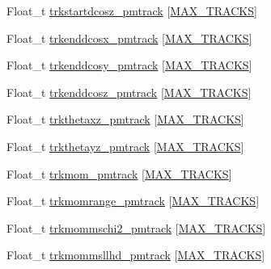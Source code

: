 \begin{DoxyCompactItemize}
\item 
Float\-\_\-t \hyperlink{classanatree_aeb6ed771022d17477ea745f1200225b0}{trkstartdcosz\-\_\-pmtrack} \mbox{[}\hyperlink{anatree__core__v09410002_8h_a327fd4e796e4a0d78947524c96e4362e}{M\-A\-X\-\_\-\-T\-R\-A\-C\-K\-S}\mbox{]}
\item 
Float\-\_\-t \hyperlink{classanatree_a372b3e3b4c13ac95a3c79db5ae540d41}{trkenddcosx\-\_\-pmtrack} \mbox{[}\hyperlink{anatree__core__v09410002_8h_a327fd4e796e4a0d78947524c96e4362e}{M\-A\-X\-\_\-\-T\-R\-A\-C\-K\-S}\mbox{]}
\item 
Float\-\_\-t \hyperlink{classanatree_a2688fec0a4bdc0ee2f671c6f250f4e93}{trkenddcosy\-\_\-pmtrack} \mbox{[}\hyperlink{anatree__core__v09410002_8h_a327fd4e796e4a0d78947524c96e4362e}{M\-A\-X\-\_\-\-T\-R\-A\-C\-K\-S}\mbox{]}
\item 
Float\-\_\-t \hyperlink{classanatree_afa667756a208ba832a307f4dd45db168}{trkenddcosz\-\_\-pmtrack} \mbox{[}\hyperlink{anatree__core__v09410002_8h_a327fd4e796e4a0d78947524c96e4362e}{M\-A\-X\-\_\-\-T\-R\-A\-C\-K\-S}\mbox{]}
\item 
Float\-\_\-t \hyperlink{classanatree_a976b72db54353c14cc663e2c23fff806}{trkthetaxz\-\_\-pmtrack} \mbox{[}\hyperlink{anatree__core__v09410002_8h_a327fd4e796e4a0d78947524c96e4362e}{M\-A\-X\-\_\-\-T\-R\-A\-C\-K\-S}\mbox{]}
\item 
Float\-\_\-t \hyperlink{classanatree_ade5e722b3626309af50f9d112f0dff5c}{trkthetayz\-\_\-pmtrack} \mbox{[}\hyperlink{anatree__core__v09410002_8h_a327fd4e796e4a0d78947524c96e4362e}{M\-A\-X\-\_\-\-T\-R\-A\-C\-K\-S}\mbox{]}
\item 
Float\-\_\-t \hyperlink{classanatree_aa411c306205f8e3b6663ab34685f2c38}{trkmom\-\_\-pmtrack} \mbox{[}\hyperlink{anatree__core__v09410002_8h_a327fd4e796e4a0d78947524c96e4362e}{M\-A\-X\-\_\-\-T\-R\-A\-C\-K\-S}\mbox{]}
\item 
Float\-\_\-t \hyperlink{classanatree_a725421ebaec99bbeaacda2ea1df8ac54}{trkmomrange\-\_\-pmtrack} \mbox{[}\hyperlink{anatree__core__v09410002_8h_a327fd4e796e4a0d78947524c96e4362e}{M\-A\-X\-\_\-\-T\-R\-A\-C\-K\-S}\mbox{]}
\item 
Float\-\_\-t \hyperlink{classanatree_ad6f4b9a484529c39f413d31fdaa51664}{trkmommschi2\-\_\-pmtrack} \mbox{[}\hyperlink{anatree__core__v09410002_8h_a327fd4e796e4a0d78947524c96e4362e}{M\-A\-X\-\_\-\-T\-R\-A\-C\-K\-S}\mbox{]}
\item 
Float\-\_\-t \hyperlink{classanatree_a7c538c0f882a2b346b7af037a89b9d00}{trkmommsllhd\-\_\-pmtrack} \mbox{[}\hyperlink{anatree__core__v09410002_8h_a327fd4e796e4a0d78947524c96e4362e}{M\-A\-X\-\_\-\-T\-R\-A\-C\-K\-S}\mbox{]}

\end{DoxyCompactItemize}
